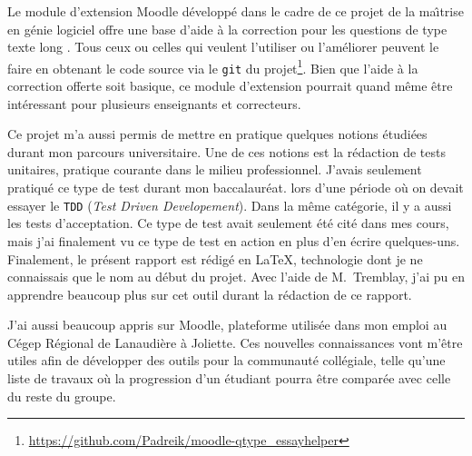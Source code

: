 \begin{conclusion}
Le module d'extension Moodle d\'evelopp\'e dans le cadre de ce projet de la ma\^\i trise en g\'enie logiciel offre une base d'aide \`a la correction pour les questions de type \og texte long \fg{}.
Tous ceux ou celles qui veulent l'utiliser ou l'am\'eliorer peuvent le faire en obtenant le code source via le \texttt{git} du projet\footnote{\url{https://github.com/Padreik/moodle-qtype_essayhelper}}.
Bien que l'aide \`a la correction offerte soit basique, ce module d'extension pourrait quand m\^eme \^etre int\'eressant pour plusieurs enseignants et correcteurs.

Ce projet m'a aussi permis de mettre en pratique quelques notions \'etudi\'ees durant mon parcours universitaire.
Une de ces notions est la r\'edaction de tests unitaires, pratique courante dans le milieu professionnel.
J'avais seulement pratiqu\'e ce type de test durant mon baccalaur\'eat. lors d'une p\'eriode o\`u on devait essayer le \texttt{TDD} (\textit{Test Driven Developement}).
Dans la m\^eme cat\'egorie, il y a aussi les tests d'acceptation.
Ce type de test avait seulement \'et\'e cit\'e dans mes cours, mais j'ai finalement vu ce type de test en action en plus d'en \'ecrire quelques-uns.
Finalement, le pr\'esent rapport est r\'edig\'e en \LaTeX, technologie dont je ne connaissais que le nom au d\'ebut du projet.
Avec l'aide de M.\ Tremblay, j'ai pu en apprendre beaucoup plus sur cet outil durant la r\'edaction de ce rapport.

J'ai aussi beaucoup appris sur Moodle, plateforme utilis\'ee dans mon emploi au C\'egep R\'egional de Lanaudi\`ere \`a Joliette.
Ces nouvelles connaissances vont m'\^etre utiles afin de d\'evelopper des outils pour la communaut\'e coll\'egiale, telle qu'une liste de travaux o\`u la progression d'un \'etudiant pourra \^etre compar\'ee avec celle du reste du groupe.


\end{conclusion}
